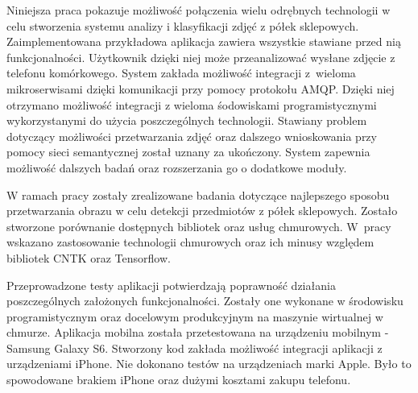 Niniejsza praca pokazuje możliwość połączenia wielu odrębnych technologii w celu stworzenia systemu analizy i klasyfikacji zdjęć z półek sklepowych. Zaimplementowana przykładowa aplikacja zawiera wszystkie stawiane przed nią funkcjonalności. Użytkownik dzięki niej może przeanalizować wysłane zdjęcie z telefonu komórkowego. System zakłada możliwość integracji z~wieloma mikroserwisami dzięki komunikacji przy pomocy protokołu AMQP. Dzięki niej otrzymano możliwość integracji z wieloma śodowiskami programistycznymi wykorzystanymi do użycia poszczególnych technologii. Stawiany problem dotyczący możliwości przetwarzania zdjęć oraz dalszego wnioskowania przy pomocy sieci semantycznej został uznany za ukończony. System zapewnia możliwość dalszych badań oraz rozszerzania go o dodatkowe moduły.

W ramach pracy zostały zrealizowane badania dotyczące najlepszego sposobu przetwarzania obrazu w celu detekcji przedmiotów z półek sklepowych. Zostało stworzone porównanie dostępnych bibliotek oraz usług chmurowych. W~pracy wskazano zastosowanie technologii chmurowych oraz ich minusy względem bibliotek CNTK oraz Tensorflow. 

Przeprowadzone testy aplikacji potwierdzają poprawność działania poszczególnych założonych funkcjonalności. Zostały one wykonane w środowisku programistycznym oraz docelowym produkcyjnym na maszynie wirtualnej w chmurze. Aplikacja mobilna została przetestowana na urządzeniu mobilnym - Samsung Galaxy S6. Stworzony kod zakłada możliwość integracji aplikacji z urządzeniami iPhone. Nie dokonano testów na urządzeniach marki Apple. Było to spowodowane brakiem iPhone oraz dużymi kosztami zakupu telefonu.